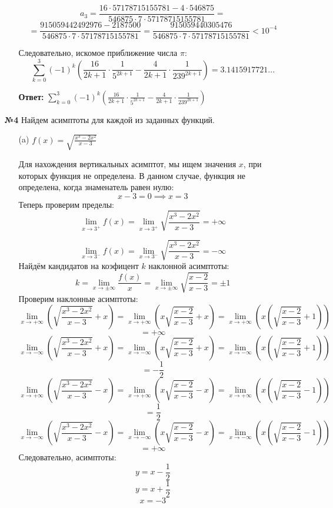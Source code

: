 \documentclass[a4paper]{article}
\renewcommand{\f}[2]{\frac{#1}{#2}}
\newcommand{\s}[2]{\sum\limits_{#1}^{#2}}
\begin{document}
\begin{enumerate}
\begin{enumerate}
        $$
        a_3 = \frac{16 \cdot 57178715155781 - 4 \cdot 546875}{546875 \cdot 7 \cdot 57178715155781} =$$
        $$= \frac{915059442492976 - 2187500}{546875 \cdot 7 \cdot 57178715155781} = \frac{915059440305476}{546875 \cdot 7 \cdot 57178715155781} < 10^{-4}
        $$

        Следовательно, искомое приближение числа $\pi$:
        $$\sum_{k=0}^{3} (-1)^{k}\left( \frac{16}{2k+1} \cdot \frac{1}{5^{2k+1}} - \frac{4}{2k+1} \cdot \frac{1}{239^{2k+1}} \right) = 3.1415917721...$$

        \textbf{Ответ: }$\s{k=0}{3} (-1)^{k}\left( \frac{16}{2k+1} \cdot \frac{1}{5^{2k+1}} - \frac{4}{2k+1} \cdot \frac{1}{239^{2k+1}} \right)$
                
    \end{enumerate}

    \item[\textbf{№4}]Найдем асимптоты для каждой из заданных функций.
    \begin{enumerate}
        \item[(a)]$ f(x) = \sqrt{\frac{x^{3}-2x^{2}}{x-3}}$
        
        Для нахождения вертикальных асимптот, мы ищем значения $ x $, при которых функция не определена. В данном случае, функция не определена, когда знаменатель равен нулю:
        $$
        x - 3 = 0 \implies x = 3
        $$
        Теперь проверим пределы:
        $$
        \lim_{x \to 3^+} f(x) = \lim_{x \to 3^+} \sqrt{\frac{x^{3}-2x^{2}}{x-3}} = +\infty
        $$

        $$
        \lim_{x \to 3^-} f(x) = \lim_{x \to 3^-} \sqrt{\frac{x^{3}-2x^{2}}{x-3}} = -\infty
        $$
        Найдём кандидатов на коэфицент $k$ наклонной асимптоты:
        $$k = \lim_{x \to \pm \infty}{\f{f(x)}{x}} = \lim_{x \to \pm \infty}\sqrt{\frac{x-2}{x-3}} = \pm 1$$ 
        Проверим наклонные асимптоты:
        $$\lim_{x \to +\infty}\left( \sqrt{\frac{x^{3}-2x^{2}}{x-3}} + x \right) = \lim_{x \to +\infty}\left( x\sqrt{\frac{x-2}{x-3}} + x \right) = \lim_{x \to +\infty}\left( x(\sqrt{\frac{x-2}{x-3}} + 1) \right) $$
        $$= +\infty$$
        $$\lim_{x \to -\infty}\left( \sqrt{\frac{x^{3}-2x^{2}}{x-3}} + x \right) = \lim_{x \to -\infty}\left( x\sqrt{\frac{x-2}{x-3}} + x \right) = \lim_{x \to -\infty}\left( x(\sqrt{\frac{x-2}{x-3}} + 1) \right) $$
        $$= -\f{1}{2}$$
        $$\lim_{x \to +\infty}\left( \sqrt{\frac{x^{3}-2x^{2}}{x-3}} - x \right) = \lim_{x \to +\infty}\left( x\sqrt{\frac{x-2}{x-3}} - x \right) = \lim_{x \to +\infty}\left( x(\sqrt{\frac{x-2}{x-3}} - 1) \right) $$
        $$= \f{1}{2}$$
        $$\lim_{x \to -\infty}\left( \sqrt{\frac{x^{3}-2x^{2}}{x-3}} - x \right) = \lim_{x \to -\infty}\left( x\sqrt{\frac{x-2}{x-3}} - x \right) = \lim_{x \to -\infty}\left( x(\sqrt{\frac{x-2}{x-3}} - 1) \right) $$
        $$= +\infty$$
        Следовательно, асимптоты:
        $$y = x-\f{1}{2}$$
        $$y = x+\f{1}{2}$$
        $$x = -3$$\\


\end{enumerate}
\end{enumerate}
\end{document}
